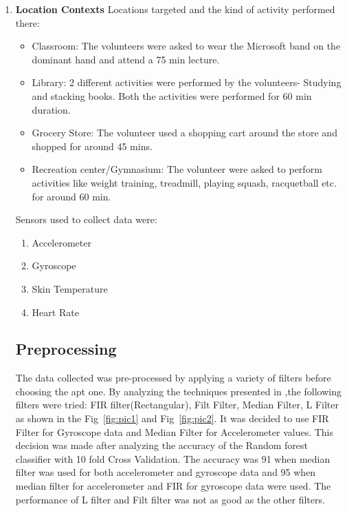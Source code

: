 \documentclass{acm_proc_article-sp}
\begin{document}
\begin{enumerate}
\item \textbf{Location Contexts}
 Locations targeted and the kind of activity performed there:
\begin{itemize}
\item Classroom: The volunteers were asked to wear the Microsoft band on the dominant hand and attend a 75 min lecture.
\item Library: 2 different activities were performed by the volunteers- Studying and stacking books. Both the activities were performed for 60 min duration.
\item Grocery Store: The volunteer used a shopping cart around the store and shopped for around 45 mins.
\item Recreation center/Gymnasium: The volunteer were asked to perform activities like weight training, treadmill, playing squash, racquetball etc. for around 60 min.
\end{itemize}
Sensors used to collect data were:
\begin{enumerate}
\item Accelerometer
\item Gyroscope
\item Skin Temperature
\item Heart Rate
\end{enumerate}

\subsection{Preprocessing}
The data collected was pre-processed by applying a variety of filters before choosing the apt one. By analyzing the techniques presented in \cite{Gjoreski11accelerometerdata}  ,the following filters were tried: FIR filter(Rectangular), Filt Filter, Median Filter, L Filter as shown in the Fig~\ref{fig:pic1} and Fig~\ref{fig:pic2}. It was decided to use FIR Filter for Gyroscope data and Median Filter for Accelerometer values. This decision was made after analyzing the accuracy of the Random forest classifier with 10 fold Cross Validation. The accuracy was 91\textsc{} when median filter was used for both accelerometer and gyroscope data and 95\textsc{} when median filter for accelerometer and FIR for gyroscope data were used. The performance of L filter and Filt filter was not as good as the other filters.


\end{enumerate}
\end{document}
